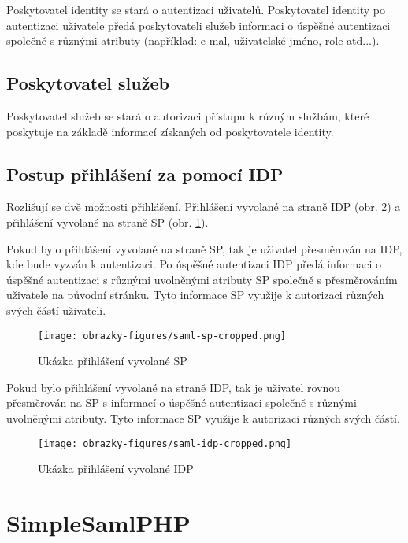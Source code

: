 Poskytovatel identity se stará o autentizaci uživatelů. Poskytovatel identity po autentizaci uživatele předá poskytovateli služeb informaci o úspěšné autentizaci společně s různými atributy (například: e-mal, uživatelské jméno, role atd...).

\subsection{Poskytovatel služeb}

Poskytovatel služeb se stará o autorizaci přístupu k různým službám, které poskytuje na základě informací získaných od poskytovatele identity.

\subsection{Postup přihlášení za pomocí IDP}\label{IDPlogin}

Rozlišují se dvě možnosti přihlášení. Přihlášení vyvolané na straně IDP (obr. \ref{saml-flow-idp}) a přihlášení vyvolané na straně SP (obr. \ref{saml-flow-sp}).


Pokud bylo přihlášení vyvolané na straně SP, tak je uživatel přesměrován na IDP, kde bude vyzván k autentizaci.
Po úspěšné autentizaci IDP předá informaci o úspěšné autentizaci s různými uvolněnými atributy SP společně s přesměrováním uživatele na původní stránku.
Tyto informace SP využije k autorizaci různých svých částí uživateli.\cite{SAMLxOIDC}
\begin{figure}[bp]
	\centering
    \texttt{[image: obrazky-figures/saml-sp-cropped.png]}
	\caption{Ukázka přihlášení vyvolané SP\cite{SAMLxOIDC}}
	\label{saml-flow-sp}
\end{figure}

Pokud bylo přihlášení vyvolané na straně IDP, tak je uživatel rovnou přesměrován na SP s informací o úspěšné autentizaci společně s různými uvolněnými atributy.
Tyto informace SP využije k autorizaci různých svých částí.\cite{SAMLxOIDC}

\begin{figure}[bp]
	\centering
    \texttt{[image: obrazky-figures/saml-idp-cropped.png]}
	\caption{Ukázka přihlášení vyvolané IDP\cite{SAMLxOIDC}}
	\label{saml-flow-idp}
\end{figure}


\section{SimpleSamlPHP} %

